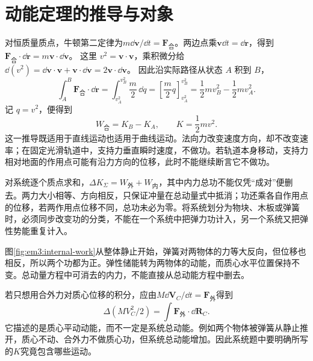 \section{动能定理的推导与对象}

对恒质量质点，牛顿第二定律为$m\dd\bm v/\dd t=\bm F_{\text{合}}$。两边点乘$\bm v\dd t=\dd\bm r$，得到 $\bm F_{\text{合}}\cdot\dd\bm r=m\bm v\cdot\dd\bm v$。
这里 $v^2=\bm v\cdot\bm v$，乘积微分给
$\dd(v^2)=\dd\bm v\cdot\bm v+\bm v\cdot\dd\bm v=2\bm v\cdot\dd\bm v$。
因此沿实际路径从状态 $A$ 积到 $B$，
\[
\int_A^B\bm F_{\text{合}}\cdot\dd\bm r
=\int_{v_A^2}^{v_B^2}\frac m2\,\dd q
=\left[\frac m2q\right]_{v_A^2}^{v_B^2}
=\frac12mv_B^2-\frac12mv_A^2.
\]
记 $q=v^2$，便得到
\begin{equation}W_{\text{合}}=K_B-K_A,\qquad K=\frac12mv^2.\label{eq:em3:workenergy}\end{equation}
这一推导既适用于直线运动也适用于曲线运动。法向力改变速度方向，却不改变速率；在固定光滑轨道中，支持力垂直瞬时速度，不做功。若轨道本身移动，支持力相对地面的作用点可能有沿力方向的位移，此时不能继续断言它不做功。

对系统逐个质点求和，$\Delta K_\Sigma=W_{\text{外}}+W_{\text{内}}$，其中内力总功不能仅凭“成对”便删去。两力大小相等、方向相反，只保证冲量在总动量式中抵消；功还乘各自作用点的位移，若两作用点位移不同，总功未必为零。将系统划分为物块、木板或弹簧时，必须同步改变功的分类，不能在一个系统中把弹力功计入，另一个系统又把弹性势能重复计入。

图\ref{fig:em3:internal-work}从整体静止开始，弹簧对两物体的力等大反向，但位移也相反，所以两个功都为正。弹性储能转为两物体的动能，而质心水平位置保持不变。总动量方程中可消去的内力，不能直接从总动能方程中删去。


若只想用合外力对质心位移的积分，应由$M\dd\bm V_C/\dd t=\bm F_{\text{外}}$得到
\[\Delta(MV_C^2/2)=\int\bm F_{\text{外}}\cdot\dd\bm R_C.\]
它描述的是质心平动动能，而不一定是系统总动能。例如两个物体被弹簧从静止推开，质心不动、合外力不做质心功，但系统总动能增加。因此系统题中要明确所写的$K$究竟包含哪些运动。

